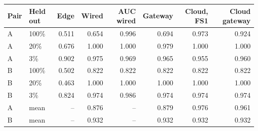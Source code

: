 \begin{tabular}{@{}llrrrrrr@{}}
\toprule
Pair & Held out & Edge & Wired & AUC wired & Gateway & Cloud, FS1 & Cloud gateway \\
\midrule
A & 100\% & 0.511 & 0.654 & 0.996 & 0.694 & 0.973 & 0.924 \\
A & 20\% & 0.676 & 1.000 & 1.000 & 0.979 & 1.000 & 1.000 \\
A & 3\% & 0.902 & 0.975 & 0.969 & 0.965 & 0.955 & 0.960 \\
B & 100\% & 0.502 & 0.822 & 0.822 & 0.822 & 0.822 & 0.822 \\
B & 20\% & 0.463 & 1.000 & 1.000 & 1.000 & 1.000 & 1.000 \\
B & 3\% & 0.824 & 0.974 & 0.986 & 0.974 & 0.974 & 0.974 \\
A & mean & -- & 0.876 & -- & 0.879 & 0.976 & 0.961 \\
B & mean & -- & 0.932 & -- & 0.932 & 0.932 & 0.932 \\
\bottomrule
\end{tabular}
